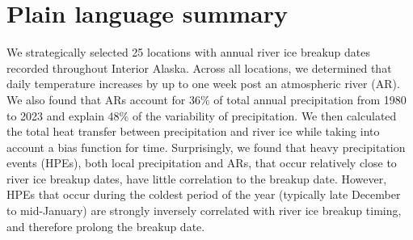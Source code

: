 \documentclass[draft]{AR_analysis_}
\begin{document}
\section*{Plain language summary}

	We strategically selected 25 locations with annual river ice
	breakup dates recorded throughout Interior Alaska. Across all
	locations, we determined that daily temperature increases by up to
	one week post an atmospheric river (AR). We also found that ARs
	account for 36\% of total annual precipitation from 1980 to 2023
	and explain 48\% of the variability of precipitation. We then
	calculated the total heat transfer between precipitation and river
	ice while taking into account a bias function for time.
	Surprisingly, we found that heavy precipitation events (HPEs),
	both local precipitation and ARs, that occur relatively close to
	river ice breakup dates, have little correlation to the breakup
	date. However, HPEs that occur during the coldest period of the
	year (typically late December to mid-January) are strongly inversely
	correlated with river ice breakup timing, and therefore prolong
	the breakup date.

%
%

%


%
%
%
%
\end{document}
